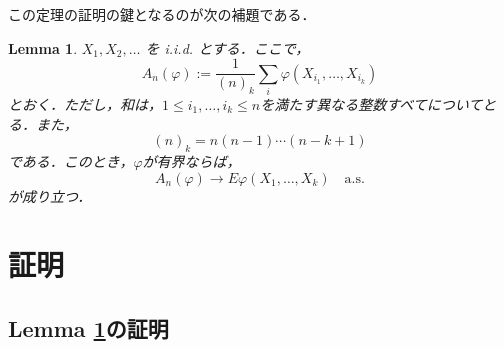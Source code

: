 \documentclass[a4paper,11pt,uplatex,dvipdfmx]{jsarticle}
\theoremstyle{plain}
\newtheorem{lemma}[theorem]{Lemma}
\theoremstyle{definition}
\begin{document}
この定理の証明の鍵となるのが次の補題である．

\begin{lemma}\label{lem:permutation}
$X_1,X_2,\dots$ を i.i.d. とする．ここで，
\[
  A_n(\varphi):=\frac{1}{(n)_k}\sum_{i}\varphi(X_{i_1},\dots,X_{i_k})
\]
とおく．ただし，和は，$1\le i_1,\dots,i_k\le n$を満たす異なる整数すべてについてとる．また，
\[(n)_k=n(n-1)\cdots(n-k+1)\]
である．このとき，$\varphi$が有界ならば，
\[A_n(\varphi)\longrightarrow E\varphi(X_1,\dots,X_k)\quad \text{a.s.}\]
が成り立つ．
\end{lemma}

\section{証明}\label{sec:proof}
\subsection{Lemma \ref{lem:permutation}の証明}
\end{document}
